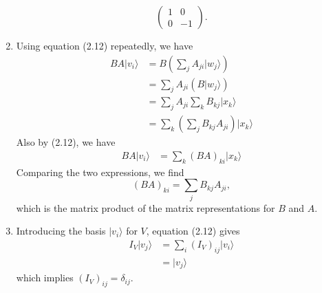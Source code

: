 \documentclass[12 pt]{article}
\begin{document}
\begin{enumerate}
$$\begin{pmatrix}
	1&0\\0&-1
\end{pmatrix}.$$
\item Using equation (2.12) repeatedly, we have 
	\begin{align*}
	BA|v_i\rangle &= B(\sum_j A_{ji}|w_j\rangle) \\
	&=\sum_j A_{ji}(B|w_j\rangle) \\
	&=\sum_j A_{ji} \sum_k B_{kj}|x_k\rangle \\
	&=\sum_k (\sum_j B_{kj}A_{ji})|x_k\rangle 
	\end{align*}
Also by (2.12), we have 
	\begin{align*}
	BA|v_i\rangle &=\sum_k (BA)_{ki}|x_k\rangle\end{align*}
Comparing the two expressions, we find
$$(BA)_{ki}=\sum_j B_{kj}A_{ji},$$
which is the matrix product of the matrix representations for $B$ and $A$.
\item Introducing the basis $|v_i\rangle$ for $V$, equation (2.12) gives
\begin{align*}
	I_V|v_j\rangle &=\sum_i (I_V)_{ij}|v_i\rangle \\
	&=|v_j\rangle
\end{align*}
which implies $(I_V)_{ij}=\delta_{ij}$.
\end{enumerate}
\end{document}
